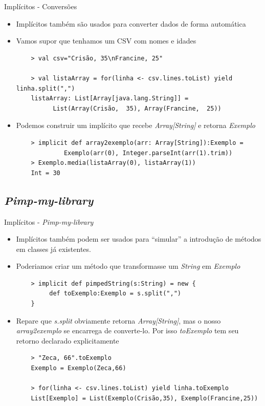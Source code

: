 \documentclass{beamer}
\begin{document}
\begin{frame}[fragile]{Implícitos - Conversões} 
    \begin{itemize} [<+->]
	\item Implícitos também são usados para converter dados de forma automática
	\item Vamos supor que tenhamos um CSV com nomes e idades
	\begin{lstlisting}
	> val csv="Crisão, 35\nFrancine, 25"
	
	> val listaArray = for(linha <- csv.lines.toList) yield linha.split(",")
	listaArray: List[Array[java.lang.String]] = 
	      List(Array(Crisão,  35), Array(Francine,  25))
	\end{lstlisting}
	\item Podemos construir um implícito que recebe \emph{Array[String]} e retorna \emph{Exemplo}
	\begin{lstlisting}
	> implicit def array2exemplo(arr: Array[String]):Exemplo =
	         Exemplo(arr(0), Integer.parseInt(arr(1).trim))
	> Exemplo.media(listaArray(0), listaArray(1))
	Int = 30
	\end{lstlisting}	
    \end{itemize}
\end{frame}

\subsection{\emph{Pimp-my-library}}

\begin{frame}[fragile]{Implícitos - \emph{Pimp-my-library}} 
    \begin{itemize} [<+->]
	\item Implícitos também podem ser usados para ``simular'' a introdução de métodos em classes já existentes.
	\item Poderiamos criar um método que transformasse um \emph{String} em \emph{Exemplo}
	\begin{lstlisting}
	> implicit def pimpedString(s:String) = new {
	     def toExemplo:Exemplo = s.split(",") 
	}
	\end{lstlisting}
	\item Repare que \emph{s.split} obviamente retorna \emph{Array[String]}, mas o nosso \emph{array2exemplo} se encarrega de converte-lo. Por isso \emph{toExemplo} tem seu retorno declarado explicitamente
	\begin{lstlisting}
	> "Zeca, 66".toExemplo
	Exemplo = Exemplo(Zeca,66)
	
	> for(linha <- csv.lines.toList) yield linha.toExemplo
	List[Exemplo] = List(Exemplo(Crisão,35), Exemplo(Francine,25))
	\end{lstlisting}	
    \end{itemize}
\end{frame}
\end{document}
